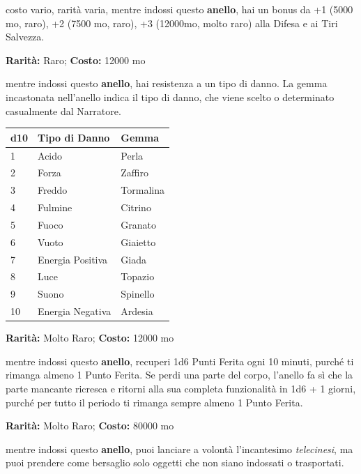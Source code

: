 \begin{multicols}{2}
costo vario, rarità varia, mentre indossi questo \textbf{anello}, hai un bonus da +1 (5000 mo, raro), +2 (7500 mo, raro), +3 (12000mo, molto raro) alla Difesa e ai Tiri Salvezza.


\textbf{Rarità:} Raro; \textbf{Costo:} 12000 mo

mentre indossi questo \textbf{anello}, hai resistenza a un tipo di danno. La gemma incastonata nell'anello indica il tipo di danno, che viene scelto o determinato casualmente dal Narratore.

\medskip

\noindent\begin{tabularx}{\linewidth}{lll}
	\toprule
\rowcolor{gray!20}\textbf{d10} & \textbf{Tipo di Danno} & \textbf{Gemma}\\
\toprule
1 &Acido &Perla\\
\rowcolor{gray!20}2& Forza &Zaffiro\\
3& Freddo &Tormalina\\
\rowcolor{gray!20}4& Fulmine &Citrino\\
5& Fuoco &Granato\\
\rowcolor{gray!20}6& Vuoto& Giaietto\\
7& Energia Positiva &Giada\\
\rowcolor{gray!20}8& Luce &Topazio\\
9& Suono &Spinello\\
\rowcolor{gray!20}10& Energia Negativa &Ardesia
\end{tabularx}

\medskip


\textbf{Rarità:} Molto Raro; \textbf{Costo:} 12000 mo

mentre indossi questo \textbf{anello}, recuperi 1d6 Punti Ferita ogni 10 minuti, purché ti rimanga almeno 1 Punto Ferita. Se perdi una parte del corpo, l'anello fa sì che la parte mancante ricresca e ritorni alla sua completa funzionalità in 1d6 + 1 giorni, purché per tutto il periodo ti rimanga sempre almeno 1 Punto Ferita.


\textbf{Rarità:} Molto Raro; \textbf{Costo:} 80000 mo

mentre indossi questo \textbf{anello}, puoi lanciare a volontà l'incantesimo \emph{telecinesi}, ma puoi prendere come bersaglio solo oggetti che non siano indossati o trasportati.


\end{multicols}
